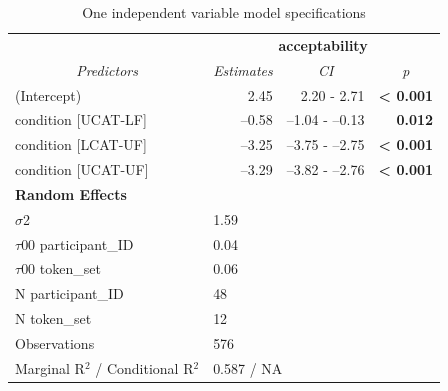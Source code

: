 \begin{table}[!h]
	\centering
	\begin{tabular}{llrr}
		\hline
		\hline
		\multicolumn{1}{c}{\textbf{}}        & \multicolumn{3}{c}{\textbf{acceptability}}                                            \\
		\multicolumn{1}{c}{\textit{Predictors}}       & \multicolumn{1}{c}{\textit{Estimates}} & \multicolumn{1}{c}{\textit{CI}} & \multicolumn{1}{c}{\textit{p}} \\ \hline
		(Intercept)                          & \multicolumn{1}{r}{2.45}      & 2.20 - 2.71            & \textbf{\textless{} 0.001}    \\
		condition {[}UCAT-LF{]}              & \multicolumn{1}{r}{--0.58}   &--1.04 - --0.13          & \textbf{0.012}                 \\
		condition {[}LCAT-UF{]}              & \multicolumn{1}{r}{--3.25}     & --3.75 - --2.75          & \textbf{\textless{} 0.001}    \\
		condition {[}UCAT-UF{]}              & \multicolumn{1}{r}{--3.29}     & --3.82 - --2.76          & \textbf{\textless{} 0.001}     \\
		\multicolumn{4}{l}{\textbf{Random Effects}}                                                                                    \\
		$\sigma$2                                   & \multicolumn{3}{l}{1.59}                                                       \\
		$\tau$00 participant\_ID                  & \multicolumn{3}{l}{0.04}                                                       \\
		$\tau$00 token\_set                       & \multicolumn{3}{l}{0.06}                                                       \\
		N participant\_ID                        & \multicolumn{3}{l}{48}                                                         \\ 
		N token\_set                         & \multicolumn{3}{l}{12}                                                         \\ \hline
		Observations                         & \multicolumn{3}{l}{576}                                                        \\
		Marginal R$^{2}$ / Conditional R$^{2}$        & \multicolumn{3}{l}{0.587 / NA}     \\    
		\hline \hline                                       
	\end{tabular}
	\caption{One independent variable model specifications}
	\label{tab:lmbasic}
\end{table}

